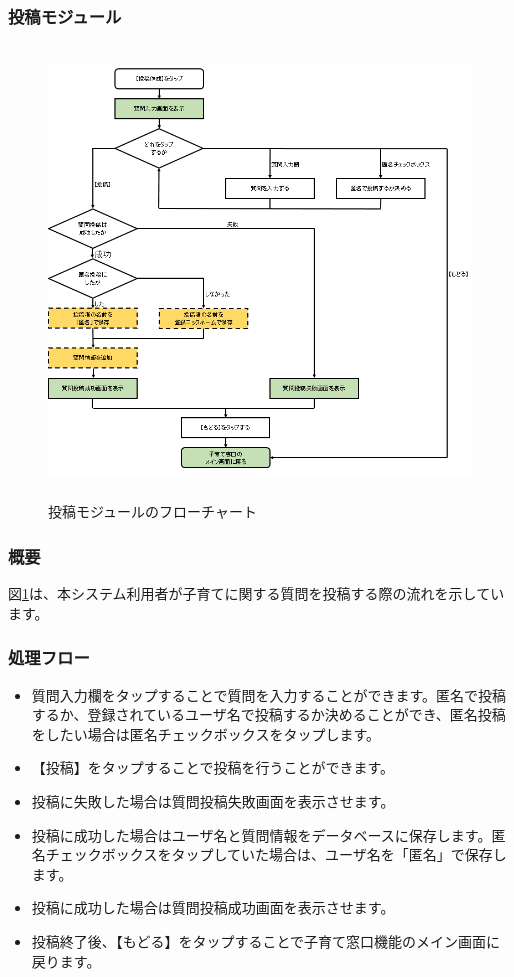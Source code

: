 \documentclass[a4j]{jarticle}
\begin{document}
\subsubsection{投稿モジュール\label{投稿}} %
\begin{figure}[H]
    \begin{center}
      \includegraphics[height = 12.0cm] {子育て窓口_投稿.png} %
    \caption {投稿モジュールのフローチャート}
    \label{子育て窓口_投稿}
    \end{center}
\end{figure}
\subsubsection*{概要}
図\ref{子育て窓口_投稿}は、本システム利用者が子育てに関する質問を投稿する際の流れを示しています。
\subsubsection*{処理フロー}
\begin{itemize}
\item 質問入力欄をタップすることで質問を入力することができます。匿名で投稿するか、登録されているユーザ名で投稿するか決めることができ、匿名投稿をしたい場合は匿名チェックボックスをタップします。
\item 【投稿】をタップすることで投稿を行うことができます。
\item 投稿に失敗した場合は質問投稿失敗画面を表示させます。
\item 投稿に成功した場合はユーザ名と質問情報をデータベースに保存します。匿名チェックボックスをタップしていた場合は、ユーザ名を「匿名」で保存します。
\item 投稿に成功した場合は質問投稿成功画面を表示させます。
\item 投稿終了後、【もどる】をタップすることで子育て窓口機能のメイン画面に戻ります。

\end{itemize}
\end{document}
